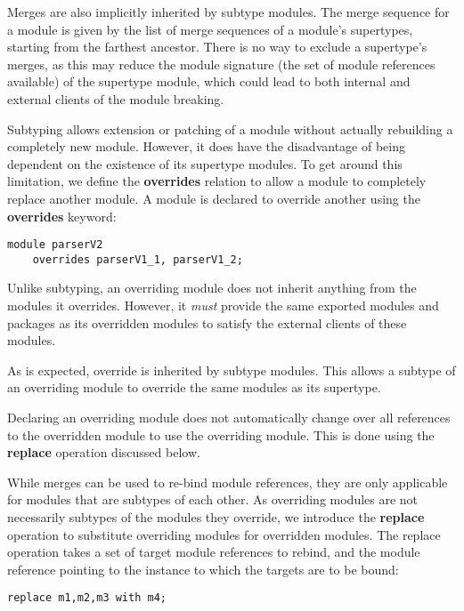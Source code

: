 Merges are also implicitly inherited by subtype modules. The merge sequence for
a module is given by the list of merge sequences of a module's supertypes, starting
from the farthest ancestor. There is no way to exclude a supertype's merges, as
this may reduce the module signature (the set of module references available) of
the supertype module, which could lead to both internal and external clients of
the module breaking.


Subtyping allows extension or patching of a module without actually
rebuilding a completely new module. However, it does have the disadvantage
of being dependent on the existence of its supertype modules. To get
around this limitation, we define the \textbf{overrides} relation to allow
a module to completely replace another module. A module is declared
to override another using the \textbf{overrides} keyword:

\begin{lstlisting}
module parserV2 
	overrides parserV1_1, parserV1_2;
\end{lstlisting}

Unlike subtyping, an overriding module does not inherit anything from the
modules it overrides. However, it \textit{must} provide the same exported modules
and packages as its overridden modules to satisfy the external 
clients of these modules.

As is expected, override is inherited by subtype modules. This allows a subtype
of an overriding module to override the same modules as its supertype.

Declaring an overriding module does not automatically change over all references
to the overridden module to use the overriding module. This is done using the
\textbf{replace} operation discussed below.


While merges can be used to re-bind module references, they are only applicable 
for modules that are subtypes of each other. As overriding modules are not
necessarily subtypes of the modules they override, we introduce the \textbf{replace} operation
to substitute overriding modules for overridden modules. The replace operation
takes a set of target module references to rebind, and the module reference pointing to the 
instance to which the targets are to be bound:

\begin{lstlisting}
replace m1,m2,m3 with m4;
\end{lstlisting}

